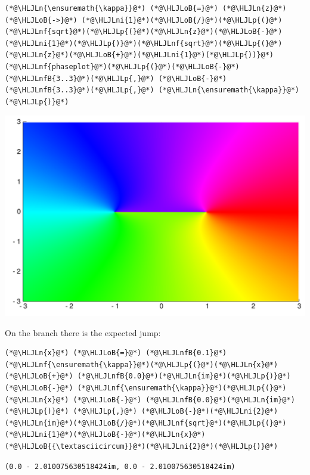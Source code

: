 \documentclass[12pt,a4paper]{article}
\newcommand{\HLJLn}[1]{#1}
\newcommand{\HLJLnf}[1]{\textcolor[RGB]{66,102,213}{#1}}
\newcommand{\HLJLnfB}[1]{\textcolor[RGB]{59,151,46}{#1}}
\newcommand{\HLJLni}[1]{\textcolor[RGB]{59,151,46}{#1}}
\newcommand{\HLJLoB}[1]{\textcolor[RGB]{102,102,102}{\textbf{#1}}}
\newcommand{\HLJLp}[1]{#1}
\begin{document}
\begin{lstlisting}
(*@\HLJLn{\ensuremath{\kappa}}@*) (*@\HLJLoB{=}@*) (*@\HLJLn{z}@*) (*@\HLJLoB{->}@*) (*@\HLJLni{1}@*)(*@\HLJLoB{/}@*)(*@\HLJLp{(}@*)(*@\HLJLnf{sqrt}@*)(*@\HLJLp{(}@*)(*@\HLJLn{z}@*)(*@\HLJLoB{-}@*)(*@\HLJLni{1}@*)(*@\HLJLp{)}@*)(*@\HLJLnf{sqrt}@*)(*@\HLJLp{(}@*)(*@\HLJLn{z}@*)(*@\HLJLoB{+}@*)(*@\HLJLni{1}@*)(*@\HLJLp{))}@*)
(*@\HLJLnf{phaseplot}@*)(*@\HLJLp{(}@*)(*@\HLJLoB{-}@*)(*@\HLJLnfB{3..3}@*)(*@\HLJLp{,}@*) (*@\HLJLoB{-}@*)(*@\HLJLnfB{3..3}@*)(*@\HLJLp{,}@*) (*@\HLJLn{\ensuremath{\kappa}}@*)(*@\HLJLp{)}@*)
\end{lstlisting}

\includegraphics[width=\linewidth]{figures/Lecture12_7_1.pdf}

On the branch there is the expected jump:


\begin{lstlisting}
(*@\HLJLn{x}@*) (*@\HLJLoB{=}@*) (*@\HLJLnfB{0.1}@*)
(*@\HLJLnf{\ensuremath{\kappa}}@*)(*@\HLJLp{(}@*)(*@\HLJLn{x}@*) (*@\HLJLoB{+}@*) (*@\HLJLnfB{0.0}@*)(*@\HLJLn{im}@*)(*@\HLJLp{)}@*) (*@\HLJLoB{-}@*) (*@\HLJLnf{\ensuremath{\kappa}}@*)(*@\HLJLp{(}@*)(*@\HLJLn{x}@*) (*@\HLJLoB{-}@*) (*@\HLJLnfB{0.0}@*)(*@\HLJLn{im}@*)(*@\HLJLp{)}@*) (*@\HLJLp{,}@*) (*@\HLJLoB{-}@*)(*@\HLJLni{2}@*)(*@\HLJLn{im}@*)(*@\HLJLoB{/}@*)(*@\HLJLnf{sqrt}@*)(*@\HLJLp{(}@*)(*@\HLJLni{1}@*)(*@\HLJLoB{-}@*)(*@\HLJLn{x}@*)(*@\HLJLoB{{\textasciicircum}}@*)(*@\HLJLni{2}@*)(*@\HLJLp{)}@*)
\end{lstlisting}

\begin{lstlisting}
(0.0 - 2.010075630518424im, 0.0 - 2.010075630518424im)
\end{lstlisting}
\end{document}
